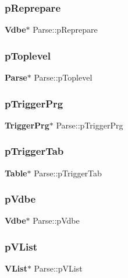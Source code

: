 \mbox{\label{struct_parse_a5e250f77353fb3df6660ff29ffa53790}} 
\subsubsection{pReprepare}
{\footnotesize\ttfamily \textbf{ Vdbe}$\ast$ Parse\+::p\+Reprepare}

\mbox{\label{struct_parse_a739df7b56510f22e64aba1ed203fec76}} 
\subsubsection{pToplevel}
{\footnotesize\ttfamily \textbf{ Parse}$\ast$ Parse\+::p\+Toplevel}

\mbox{\label{struct_parse_a0891dbd3b583594c5d07d7b061026ea4}} 
\subsubsection{pTriggerPrg}
{\footnotesize\ttfamily \textbf{ Trigger\+Prg}$\ast$ Parse\+::p\+Trigger\+Prg}

\mbox{\label{struct_parse_aad9b1145e39b240e842f9c2ad8e7e230}} 
\subsubsection{pTriggerTab}
{\footnotesize\ttfamily \textbf{ Table}$\ast$ Parse\+::p\+Trigger\+Tab}

\mbox{\label{struct_parse_a81774053fd5063046f532c07e3daa98b}} 
\subsubsection{pVdbe}
{\footnotesize\ttfamily \textbf{ Vdbe}$\ast$ Parse\+::p\+Vdbe}

\mbox{\label{struct_parse_a431655fd69a241f54bb096bf9ea65b81}} 
\subsubsection{pVList}
{\footnotesize\ttfamily \textbf{ V\+List}$\ast$ Parse\+::p\+V\+List}

